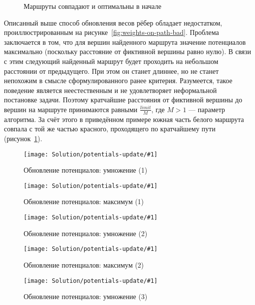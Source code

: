 \begin{figure}
    \caption{Маршруты совпадают и оптимальны в начале}
    \label{fig:weights-on-path-good}
\end{figure}

Описанный выше способ обновления весов рёбер обладает недостатком,
проиллюстрированным на рисунке~\ref{fig:weights-on-path-bad}. Проблема
заключается в том, что для вершин найденного маршрута значение
потенциалов максимально (поскольку расстояние от фиктивной вершины
равно нулю). В связи с этим следующий найденный маршрут будет
проходить на небольшом расстоянии от предыдущего. При этом он станет
длиннее, но не станет непохожим в смысле сформулированного ранее
критерия. Разумеется, такое поведение является неестественным и не
удовлетворяет неформальной постановке задачи. Поэтому кратчайшие
расстояния от фиктивной вершины до вершин на маршруте принимаются
равными $\frac{limit}{M}$, где $M > 1$ --- параметр алгоритма. За счёт
этого в приведённом примере южная часть белого маршрута совпала с той
же частью красного, проходящего по кратчайшему пути
(рисунок~\ref{fig:weights-on-path-good}).

\newcommand{\potentialsupdatepicture}[1]{
    \begin{center}
    \texttt{[image: Solution/potentials-update/\#1]}
    \end{center}
}

\begin{figure}
    \potentialsupdatepicture{accum1}
    \caption{Обновление потенциалов: умножение (1)}
    \label{fig:update-accum1}
\end{figure}

\begin{figure}
    \potentialsupdatepicture{max1}
    \caption{Обновление потенциалов: максимум (1)}
    \label{fig:update-max1}
\end{figure}

\begin{figure}
    \potentialsupdatepicture{accum2}
    \caption{Обновление потенциалов: умножение (2)}
    \label{fig:update-accum2}
\end{figure}

\begin{figure}
    \potentialsupdatepicture{max2}
    \caption{Обновление потенциалов: максимум (2)}
    \label{fig:update-max2}
\end{figure}

\begin{figure}
    \potentialsupdatepicture{accum3}
    \caption{Обновление потенциалов: умножение (3)}
    \label{fig:update-accum3}
\end{figure}

